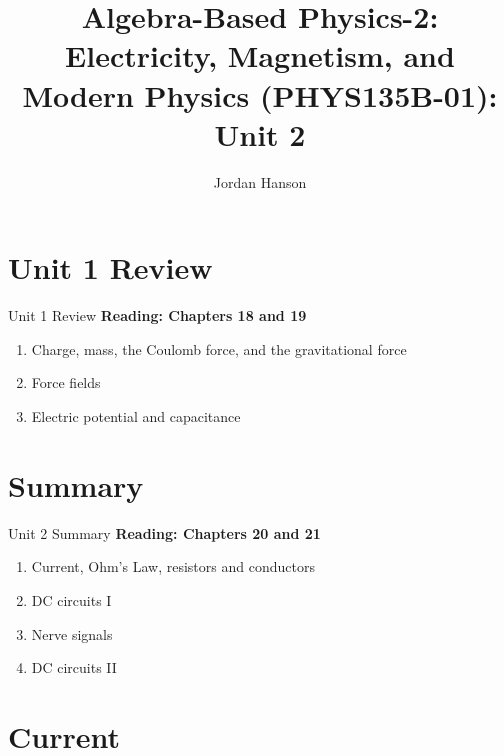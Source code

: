 \documentclass{beamer}
\title{Algebra-Based Physics-2: Electricity, Magnetism, and Modern Physics (PHYS135B-01): Unit 2}
\author{Jordan Hanson}
\institute{Whittier College Department of Physics and Astronomy}
\begin{document}
\maketitle

\section{Unit 1 Review}

\begin{frame}{Unit 1 Review}
\textbf{Reading: Chapters 18 and 19}
\begin{enumerate}
\item Charge, mass, the Coulomb force, and the gravitational force
\item Force fields
\item Electric potential and capacitance
\end{enumerate}
\end{frame}

\section{Summary}

\begin{frame}{Unit 2 Summary}
\textbf{Reading: Chapters 20 and 21}
\begin{enumerate}
\item Current, Ohm's Law, resistors and conductors
\item DC circuits I
\item Nerve signals
\item \alert{DC circuits II}
\end{enumerate}
\end{frame}

\section{Current}
\end{document}

